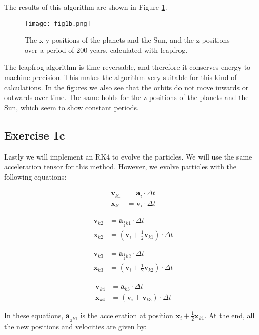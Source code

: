 The results of this algorithm are shown in Figure \ref{fig:1b}. 
\begin{figure}[h!]
  \centering
  \texttt{[image: fig1b.png]}
  \caption{The x-y positions of the planets and the Sun, and the z-positions over a period of 200 years, calculated with leapfrog.}
  \label{fig:1b}
\end{figure}

The leapfrog algorithm is time-reversable, and therefore it conserves energy to machine precision. This makes the algorithm very suitable for this kind of calculations. In the figures we also see that the orbits do not move inwards or outwards over time. The same holds for the z-positions of the planets and the Sun, which seem to show constant periods.

\subsection{Exercise 1c}
Lastly we will implement an RK4 to evolve the particles. We will use the same acceleration tensor for this method. However, we evolve particles with the following equations: 

\begin{align}
    \mathbf{v}_{k1} &= \mathbf{a}_i \cdot \Delta t \\
    \mathbf{x}_{k1} &= \mathbf{v}_i \cdot \Delta t
\end{align}

\begin{align}
    \mathbf{v}_{k2} &= \mathbf{a}_{\frac{1}{2}k1} \cdot \Delta t \\
    \mathbf{x}_{k2} &= (\mathbf{v}_i  + \frac{1}{2}\mathbf{v}_{k1}) \cdot \Delta t
\end{align}

\begin{align}
    \mathbf{v}_{k3} &= \mathbf{a}_{\frac{1}{2}k2} \cdot \Delta t \\
    \mathbf{x}_{k3} &= (\mathbf{v}_i  + \frac{1}{2}\mathbf{v}_{k2}) \cdot \Delta t
\end{align}

\begin{align}
    \mathbf{v}_{k4} &= \mathbf{a}_{k3} \cdot \Delta t \\
    \mathbf{x}_{k4} &= (\mathbf{v}_i  + \mathbf{v}_{k3}) \cdot \Delta t
\end{align}

In these equations, $\mathbf{a}_{\frac{1}{2}k1}$ is the acceleration at position $ \mathbf{x}_i + \frac{1}{2}\mathbf{x}_{k1}$. At the end, all the new positions and velocities are given by: 

